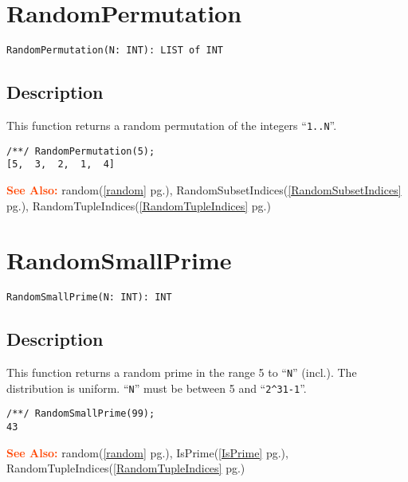 \documentclass[a4paper]{mybook}
\newenvironment{command}{}{} %
\newcommand\SeeAlso{\par\textcolor{OrangeRed}{\textbf{\large See Also: }}}
\begin{document}
\section{RandomPermutation}
\label{RandomPermutation}
\begin{command} %


\begin{Verbatim}[label=syntax, rulecolor=\color{MidnightBlue},
frame=single]
RandomPermutation(N: INT): LIST of INT
\end{Verbatim}


\subsection*{Description}

This function returns a random permutation of the integers ``\verb&1..N&''.
\begin{Verbatim}[label=example, rulecolor=\color{PineGreen}, frame=single]
/**/ RandomPermutation(5);
[5,  3,  2,  1,  4]
\end{Verbatim}


\SeeAlso %
  random(\ref{random} pg.\pageref{random}), 
    RandomSubsetIndices(\ref{RandomSubsetIndices} pg.\pageref{RandomSubsetIndices}), 
    RandomTupleIndices(\ref{RandomTupleIndices} pg.\pageref{RandomTupleIndices})
\end{command} %

\section{RandomSmallPrime}
\label{RandomSmallPrime}
\begin{command} %


\begin{Verbatim}[label=syntax, rulecolor=\color{MidnightBlue},
frame=single]
RandomSmallPrime(N: INT): INT
\end{Verbatim}


\subsection*{Description}

This function returns a random prime in the range 5 to ``\verb&N&'' (incl.).
The distribution is uniform.  ``\verb&N&'' must be between 5 and ``\verb&2^31-1&''.
\begin{Verbatim}[label=example, rulecolor=\color{PineGreen}, frame=single]
/**/ RandomSmallPrime(99);
43
\end{Verbatim}


\SeeAlso %
  random(\ref{random} pg.\pageref{random}), 
    IsPrime(\ref{IsPrime} pg.\pageref{IsPrime}), 
    RandomTupleIndices(\ref{RandomTupleIndices} pg.\pageref{RandomTupleIndices})
\end{command} %
\end{document}
